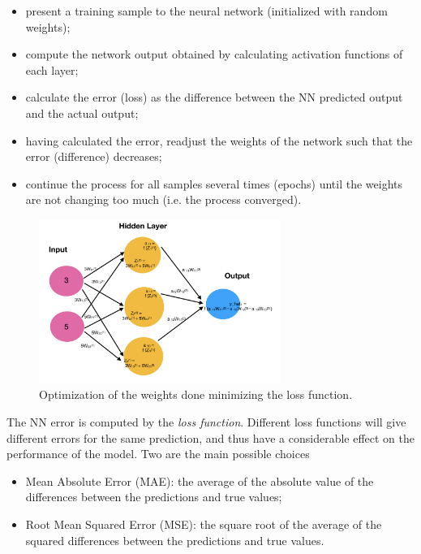 \begin{itemize}
	\tightlist
	\item
	present a training sample to the neural network (initialized with
	random weights);
	\item
	compute the network output obtained by calculating activation functions of each layer;
	\item
	calculate the error (loss) as the difference between the NN predicted
	output and the actual output;
	\item
	having calculated the error, readjust the weights of the network such
	that the error (difference) decreases;
	\item
	continue the process for all samples several times (epochs) until the
	weights are not changing too much (i.e. the process converged).
\end{itemize}

\begin{figure}[htb]
	\centering
	\includegraphics[width=0.7\textwidth]{figures/training_nn}
	\caption{Optimization of the weights done minimizing the loss function.}
\end{figure}

The NN error is computed by the \emph{loss function}. Different loss
functions will give different errors for the same prediction, and thus
have a considerable effect on the performance of the model. Two are the
main possible choices

\begin{itemize}
	\tightlist
	\item
	Mean Absolute Error (MAE): the average of the absolute value of the
	differences between the predictions and true values;
	\item
	Root Mean Squared Error (MSE): the square root of the average of the
	squared differences between the predictions and true values.
\end{itemize}

